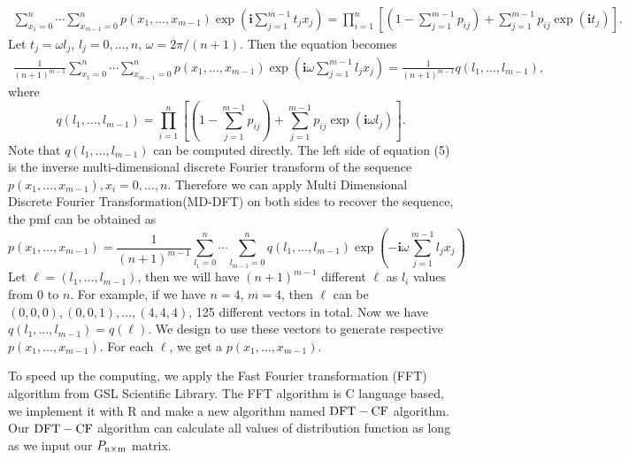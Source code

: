 \documentclass[12pt]{article}
\newcommand{\ivec}{{\boldsymbol{i}}}
\newcommand{\dft}{{\rm DFT-CF}}
\begin{document}
\begin{align*}
\sum_{x_1 = 0}^{n}\cdots \sum_{x_{m-1} = 0}^n p(x_1,\ldots,x_{m-1})\exp\left(\ivec\sum_{j=1}^{m-1}t_jx_j\right)= \prod_{i=1}^{n}\left[(1 - \sum_{j=1}^{m-1}p_{ij})+\sum_{j=1}^{m-1}p_{ij}\exp(\ivec t_j)\right].
\end{align*}
Let $t_j = \omega l_j$, $l_j = 0, \ldots, n$, $\omega = 2\pi/(n+1)$. Then the equation becomes
\begin{align}
\frac{1}{(n+1)^{m-1}} \sum_{x_1 = 0}^{n}\cdots \sum_{x_{m-1} = 0}^n p(x_1,\ldots,x_{m-1}) \exp\left(\ivec\omega\sum_{j=1}^{m-1}l_j x_j\right)= \frac{1}{(n+1)^{m-1}} q(l_1, \ldots, l_{m-1}),
\end{align}
where
$$ q(l_1, \ldots, l_{m-1})=\prod_{i=1}^{n}\left[(1 - \sum_{j=1}^{m-1}p_{ij})+\sum_{j=1}^{m-1}p_{ij}\exp(\ivec \omega l_j)\right].$$	
Note that $q(l_1, \ldots, l_{m-1})$ can be computed directly. The left side of equation (5) is the inverse multi-dimensional discrete Fourier transform of the sequence $ p(x_1,\ldots,x_{m-1}), x_i = 0 , \dots, n$. Therefore we can apply Multi Dimensional Discrete Fourier Transformation(MD-DFT) on both sides to recover the sequence, the pmf can be obtained as
\begin{equation}
p(x_1, \ldots, x_{m-1}) = \frac{1}{(n+1)^{m-1}}\sum_{l_1 = 0}^{n}\cdots \sum_{l_{m-1} = 0}^n q(l_1, \ldots, l_{m-1}) \exp\left(-\ivec\omega\sum_{j=1}^{m-1}l_j x_j\right)
\end{equation}
Let $\ell = (l_1,\dots,l_{m-1})$, then we will have $(n
+1)^{m-1}$ different $\ell$ as $l_i$ values from $0$ to $n$. For example, if we have $n=4$, $m=4$, then $\ell$ can be $(0, 0, 0), (0, 0, 1), \dots, (4, 4, 4)$, 125 different vectors in total. Now we have $q(l_1,\dots,l_{m-1}) = q(\ell)$. We design to use these vectors to generate respective $p(x_1,\dots,x_{m-1})$. For each $\ell$, we get a $p(x_1,\dots,x_{m-1})$.

To speed up the computing, we apply the Fast Fourier transformation (FFT) algorithm  from GSL Scientific Library. The FFT algorithm is C language based, we implement it with R and make a new algorithm named $\dft$ algorithm. Our $\dft$ algorithm can calculate all values of distribution function as long as we input our $P_{\rm n \times m}$ matrix.



\end{document}
